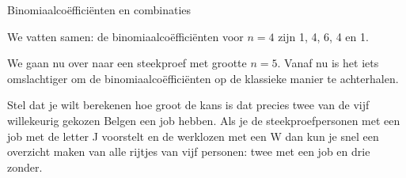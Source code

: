 \begin{lesactiviteit}{Binomiaalcoëfficiënten en combinaties}
\begin{vraagenantwoord}
    
\end{vraagenantwoord}

We vatten samen: de binomiaalcoëfficiënten voor $n=4$ zijn \textcolor{kleurloep}{1}, \textcolor{kleurloep}{4}, \textcolor{kleurloep}{6}, \textcolor{kleurloep}{4} en \textcolor{kleurloep}{1}.

We gaan nu over naar een steekproef met grootte $n=5$. Vanaf nu is het iets omslachtiger om de binomiaalcoëfficiënten op de klassieke manier te achterhalen. 


Stel dat je wilt berekenen hoe groot de kans is dat precies twee van de vijf willekeurig gekozen Belgen een job hebben. Als je de steekproefpersonen met een job met de letter J voorstelt en de werklozen met een W dan kun je snel een overzicht maken van alle rijtjes van vijf personen: twee met een job en drie zonder.

\begin{vraagenantwoord}[resume]


\end{vraagenantwoord}
\end{lesactiviteit}
